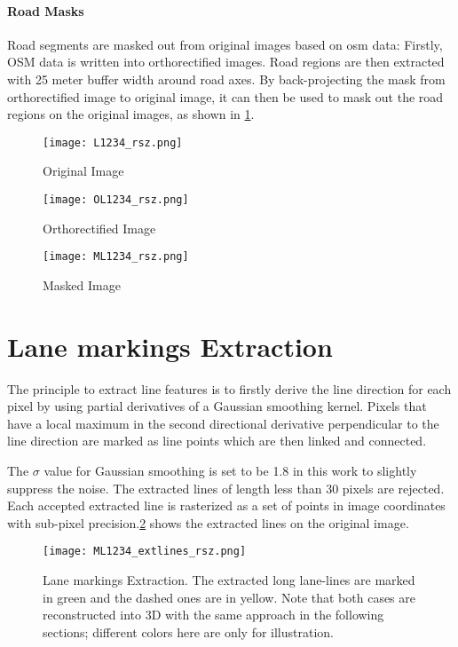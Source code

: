 \paragraph{Road Masks}
Road segments are masked out from original images based on \gls{osm} data: Firstly, OSM data is written into orthorectified images. Road regions are then extracted with 25 meter buffer width around road axes. By back-projecting the mask from orthorectified image to original image, it can then be used to mask out the road regions on the original images, as shown in \cref{fig:MaskedImg}.

\begin{figure}%
  \parbox{.45\linewidth}{
    \centering
    \texttt{[image: L1234\_rsz.png]}
    \caption{Original Image}
    \label{fig:OriImg}
  }
  \hfill
  \parbox{.45\linewidth}{
    \centering
    \texttt{[image: OL1234\_rsz.png]}
    \caption{Orthorectified Image}
    \label{fig:OrthoImg}
  }
    \centering
    \texttt{[image: ML1234\_rsz.png]}
    \caption{Masked Image}
    \label{fig:MaskedImg}
\end{figure}

\clearpage

\section{Lane markings Extraction}
\label{sec:LineExtraction}

The principle to extract line features is to firstly derive the line direction for each pixel by using partial derivatives of a Gaussian smoothing kernel. Pixels that have a local maximum in the second directional derivative perpendicular to the line direction are marked as line points which are then linked and connected.

The $\sigma$ value for Gaussian smoothing is set to be 1.8 in this work to slightly suppress the noise. The extracted lines of length less than 30 pixels are rejected. Each accepted extracted line is rasterized as a set of points in image coordinates with sub-pixel precision.\cref{fig:LineExtraction} shows the extracted lines on the original image.
\begin{figure}
  \centering
  \texttt{[image: ML1234\_extlines\_rsz.png]}
  \caption{Lane markings Extraction. The extracted long lane-lines are marked in green and the dashed ones are in yellow.  Note that both cases are reconstructed into 3D with the same approach in the following sections; different colors here are only for illustration.}
  \label{fig:LineExtraction}
\end{figure}

